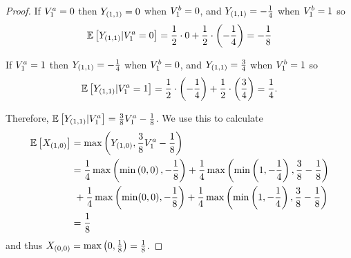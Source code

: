 \begin{proof}
        If $V^a_{1}=0$ then $Y_{(1,1)}=0$ when $V^b_{1}=0$, and 
        $Y_{(1,1)}=-\frac{1}{4}$ when $V^b_{1}=1$ so
        \[
            \mathbb{E}\left[
                Y_{(1,1)}
                | V^a_{1}=0
            \right]
            =
            \frac{1}{2}\cdot 0
            +
            \frac{1}{2}\cdot\left(-\frac{1}{4}\right) 
            =
            -\frac{1}{8}
        \]

        If $V^a_{1}=1$ then $Y_{(1,1)}=-\frac{1}{4}$ when $V^b_{1}=0$, and 
        $Y_{(1,1)}=\frac{3}{4}$ when $V^b_{1}=1$ so
        \[
            \mathbb{E}\left[
                Y_{(1,1)}
                | V^a_{1}=1
            \right]
            =
            \frac{1}{2}\cdot \left(-\frac{1}{4}\right)
            +
            \frac{1}{2}\cdot\left(\frac{3}{4}\right) 
            =
            \frac{1}{4} .
        \]

    \noindent
    Therefore, 
    \(
        \mathbb{E}\left[
            Y_{(1,1)}
            | V^a_{1}
        \right]
        =
        \frac{3}{8}V^a_{1}
        -
        \frac{1}{8}
    \).
    We use this to calculate
    \begin{align*}
        \mathbb{E}\left[
            X_{(1,0)}
        \right]
        &=
        \max\left(
            Y_{(1,0)},
            \frac{3}{8}V^a_{1}
            -
            \frac{1}{8}
        \right)
        \\
        &=
        \frac{1}{4}
        \max\left(
            \min\left(
                0,0
            \right),
            -
            \frac{1}{8}
        \right)
        +
        \frac{1}{4}
        \max\left(
            \min\left(
                1, -\frac{1}{4}
            \right),
            \frac{3}{8}-\frac{1}{8}
        \right)
        \\
        &~+
        \frac{1}{4}
        \max\left(
            \min(0,0),
            -\frac{1}{8}
        \right)
        +
        \frac{1}{4}
        \max\left(
            \min\left(
                1, -\frac{1}{4}
            \right),
            \frac{3}{8}-\frac{1}{8}
        \right)
        \\
        &= 
        \frac{1}{8}
    \end{align*}  
    and thus 
    \(
        X_{(0,0)}
        =
        \max\left(0,\frac{1}{8}\right)
        =
        \frac{1}{8}
    \).


\end{proof}
